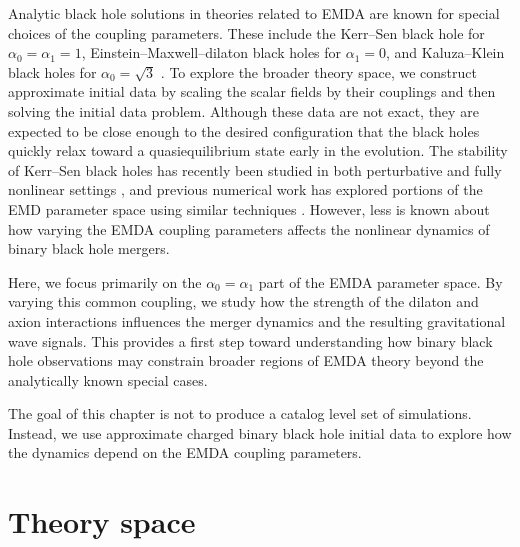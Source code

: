 Analytic black hole solutions in theories related to EMDA are known for special choices of the coupling parameters. These include the Kerr--Sen black hole for $\alpha_0=\alpha_1=1$, Einstein--Maxwell--dilaton black holes for $\alpha_1=0$, and Kaluza--Klein black holes for $\alpha_0=\sqrt{3}$ \cite{Sen1992,Sen1995,Horne1992,Mignemi1993_ChargedStringBH}. To explore the broader theory space, we construct approximate initial data by scaling the scalar fields by their couplings and then solving the initial data problem. Although these data are not exact, they are expected to be close enough to the desired configuration that the black holes quickly relax toward a quasiequilibrium state early in the evolution. The stability of Kerr--Sen black holes has recently been studied in both perturbative and fully nonlinear settings \cite{PopeRohrerWhiting2025,Carroll2026KerrSenStability}, and previous numerical work has explored portions of the EMD parameter space using similar techniques \cite{Hirschmann2018}. However, less is known about how varying the EMDA coupling parameters affects the nonlinear dynamics of binary black hole mergers.

Here, we focus primarily on the $\alpha_0=\alpha_1$ part of the EMDA parameter space. By varying this common coupling, we study how the strength of the dilaton and axion interactions influences the merger dynamics and the resulting gravitational wave signals. This provides a first step toward understanding how binary black hole observations may constrain broader regions of EMDA theory beyond the analytically known special cases.

The goal of this chapter is not to produce a catalog level set of simulations. Instead, we use approximate charged binary black hole initial data to explore how the dynamics depend on the EMDA coupling parameters.

\section{Theory space}
\label{sec:theory_space}

